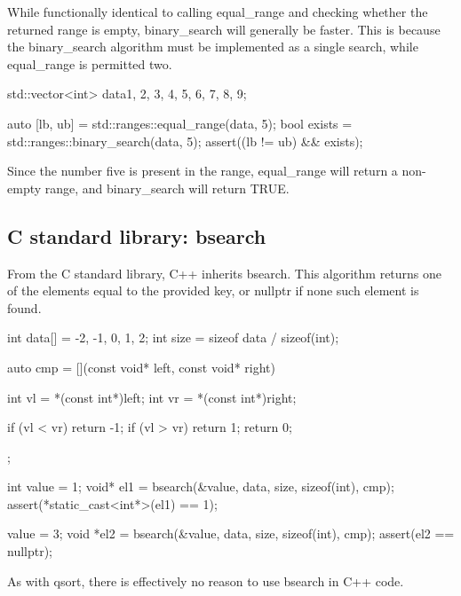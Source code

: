 

While functionally identical to calling equal\_range and checking whether the returned range is empty, binary\_search will generally be faster. This is because the binary\_search algorithm must be implemented as a single search, while equal\_range is permitted two.

\begin{box-note}
\begin{cppcode}
std::vector<int> data{1, 2, 3, 4, 5, 6, 7, 8, 9};

auto [lb, ub] = std::ranges::equal_range(data, 5);
bool exists = std::ranges::binary_search(data, 5);
assert((lb != ub) && exists);
\end{cppcode}
\end{box-note}

Since the number five is present in the range, equal\_range will return a non-empty range, and binary\_search will return TRUE.

\subsection{C standard library: bsearch}

From the C standard library, C++ inherits bsearch. This algorithm returns one of the elements equal to the provided key, or nullptr if none such element is found.

\begin{box-note}
\begin{cppcode}
int data[] = {-2, -1, 0, 1, 2};
int size = sizeof data / sizeof(int);

auto cmp = [](const void* left, const void* right){
    int vl = *(const int*)left;
    int vr = *(const int*)right;

    if (vl < vr) return -1;
    if (vl > vr) return 1;
    return 0;
};

int value = 1;
void* el1 = bsearch(&value, data, size, sizeof(int), cmp);
assert(*static_cast<int*>(el1) == 1);

value = 3;
void *el2 = bsearch(&value, data, size, sizeof(int), cmp); 
assert(el2 == nullptr);
\end{cppcode}
\end{box-note}

As with qsort, there is effectively no reason to use bsearch in C++ code.

